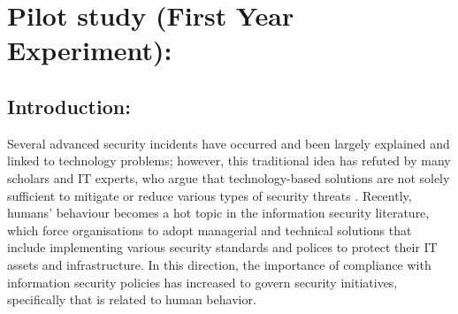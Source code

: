 
\section{Pilot study (First Year Experiment):}
\subsection {Introduction:}
Several advanced security incidents have occurred and been largely explained and linked to technology problems; however, this traditional idea has refuted by many scholars and IT experts, who argue that technology-based solutions are not solely sufficient to mitigate or reduce various types of security threats \cite{Kim2014,Ashenden2008,Safa2015}. Recently, humans' behaviour becomes a hot topic in the information security literature, which force organisations to adopt managerial and technical solutions that include implementing various security standards and polices to protect their IT assets and infrastructure. 
In this direction, the importance of compliance with information security policies has increased to govern security initiatives, specifically that is related to human behavior. \

